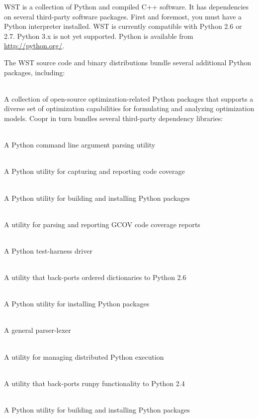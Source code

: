 WST is a collection of Python and compiled C++ software. It has
dependencies on several third-party software packages. First and
foremost, you must have a Python interpreter installed. WST is
currently compatible with Python 2.6 or 2.7. Python 3.x is not yet
supported. Python is available from \url{http://python.org/}.

The WST source code and binary distributions bundle several additional
Python packages, including:
\begin{description}[topsep=0pt,parsep=0.5em,itemsep=-0.4em,labelindent=2em,leftmargin=4em]
\item[Coopr]\hfill\\ A collection of open-source optimization-related
  Python packages that supports a diverse set of optimization
  capabilities for formulating and analyzing optimization models. Coopr
  in turn bundles several third-party dependency libraries:
  \begin{description}[topsep=0pt,parsep=0.5em,itemsep=-0.4em]
  \item[argparse]\hfill\\ A Python command line argument parsing utility
  \item[coverage]\hfill\\ A Python utility for capturing and reporting
    code coverage
  \item[distribute]\hfill\\ A Python utility for building and installing
    Python packages
  \item[gcovr]\hfill\\ A utility for parsing and reporting GCOV code
    coverage reports
  \item[nose]\hfill\\ A Python test-harness driver
  \item[ordereddict]\hfill\\ A utility that back-ports ordered
    dictionaries to Python 2.6
  \item[pip]\hfill\\ A Python utility for installing Python packages
  \item[ply]\hfill\\ A general parser-lexer
  \item[pyro]\hfill\\ A utility for managing distributed Python execution
  \item[runpy2]\hfill\\ A utility that back-ports runpy functionality to Python 2.4
  \item[setuptools]\hfill\\ A Python utility for building and installing Python packages

\end{description}
\end{description}
